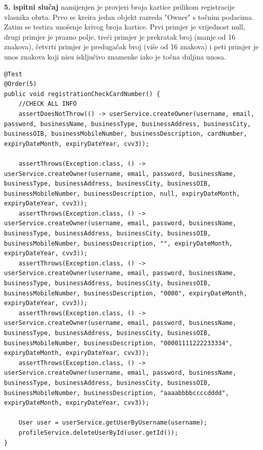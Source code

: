         \textbf{5. ispitni slučaj}{ namijenjen je provjeri broja kartice prilikom registracije vlasnika obrta. Prvo se kreira jedan objekt razreda "Owner" s točnim podacima. Zatim se testira unošenje krivog broja kartice. Prvi primjer je vrijednost null, drugi primjer je prazno polje, treći primjer je prekratak broj (manje od 16 znakova), četvrti primjer je predugačak broj (više od 16 znakova) i peti primjer je unos znakova koji nisu isključivo znamenke iako je točna duljina unosa.}
           \begin{lstlisting}
@Test
@Order(5)
public void registrationCheckCardNumber() {
    //CHECK ALL INFO
    assertDoesNotThrow(() -> userService.createOwner(username, email, password, businessName, businessType, businessAddress, businessCity, businessOIB, businessMobileNumber, businessDescription, cardNumber, expiryDateMonth, expiryDateYear, cvv3));

    assertThrows(Exception.class, () -> userService.createOwner(username, email, password, businessName, businessType, businessAddress, businessCity, businessOIB, businessMobileNumber, businessDescription, null, expiryDateMonth, expiryDateYear, cvv3));
    assertThrows(Exception.class, () -> userService.createOwner(username, email, password, businessName, businessType, businessAddress, businessCity, businessOIB, businessMobileNumber, businessDescription, "", expiryDateMonth, expiryDateYear, cvv3));
    assertThrows(Exception.class, () -> userService.createOwner(username, email, password, businessName, businessType, businessAddress, businessCity, businessOIB, businessMobileNumber, businessDescription, "0000", expiryDateMonth, expiryDateYear, cvv3));
    assertThrows(Exception.class, () -> userService.createOwner(username, email, password, businessName, businessType, businessAddress, businessCity, businessOIB, businessMobileNumber, businessDescription, "00001111222233334", expiryDateMonth, expiryDateYear, cvv3));
    assertThrows(Exception.class, () -> userService.createOwner(username, email, password, businessName, businessType, businessAddress, businessCity, businessOIB, businessMobileNumber, businessDescription, "aaaabbbbccccdddd", expiryDateMonth, expiryDateYear, cvv3));

    User user = userService.getUserByUsername(username);
    profileService.deleteUserById(user.getId());
}
        \end{lstlisting}

